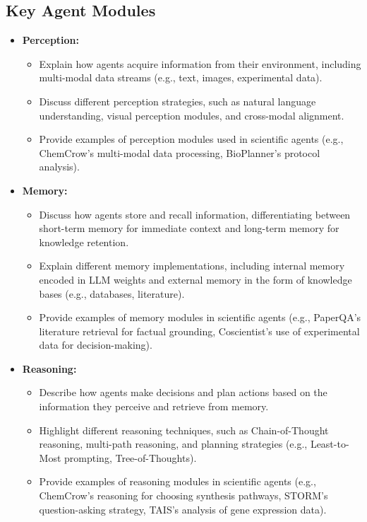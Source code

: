 \documentclass{article}
\begin{document}
\subsection{Key Agent Modules}
\begin{itemize}
    \item \textbf{Perception:}
    \begin{itemize}
        \item Explain how agents acquire information from their environment, including multi-modal data streams (e.g., text, images, experimental data).
        \item Discuss different perception strategies, such as natural language understanding, visual perception modules, and cross-modal alignment.
        \item Provide examples of perception modules used in scientific agents (e.g., ChemCrow's multi-modal data processing, BioPlanner's protocol analysis).
    \end{itemize}
    \item \textbf{Memory:}
    \begin{itemize}
        \item Discuss how agents store and recall information, differentiating between short-term memory for immediate context and long-term memory for knowledge retention.
        \item Explain different memory implementations, including internal memory encoded in LLM weights and external memory in the form of knowledge bases (e.g., databases, literature).
        \item Provide examples of memory modules in scientific agents (e.g., PaperQA's literature retrieval for factual grounding, Coscientist's use of experimental data for decision-making).
    \end{itemize}
    \item \textbf{Reasoning:}
    \begin{itemize}
        \item Describe how agents make decisions and plan actions based on the information they perceive and retrieve from memory.
        \item Highlight different reasoning techniques, such as Chain-of-Thought reasoning, multi-path reasoning, and planning strategies (e.g., Least-to-Most prompting, Tree-of-Thoughts).
        \item Provide examples of reasoning modules in scientific agents (e.g., ChemCrow's reasoning for choosing synthesis pathways, STORM's question-asking strategy, TAIS's analysis of gene expression data).

\end{itemize}
\end{itemize}
\end{document}
